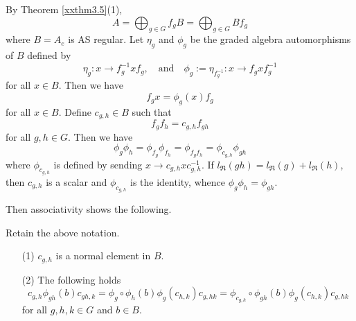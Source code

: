 By Theorem \ref{xxthm3.5}(1),
$$A=\bigoplus_{g\in G} f_g B=\bigoplus_{g\in G} B f_g$$
where $B=A_e$ is AS regular. Let $\eta_g$ and $\phi_g$ be the
graded algebra automorphisms of $B$ defined by
\begin{equation}
\label{E3.5.1}\tag{E3.5.1}
\eta_g: x\to f_{g}^{-1} x f_g, \quad {\text{and}} \quad 
\phi_{g}:=\eta_{f_g^{-1}}: x\to f_g x f_g^{-1}
\end{equation}
for all $x\in B$. Then we have 
$$f_g x= \phi_g(x) f_g$$ 
for all $x\in B$. Define $c_{g,h}\in B$ such that
\begin{equation}
\label{E3.5.2}\tag{E3.5.2}
 f_g f_h=c_{g,h} f_{gh}
\end{equation}
for all $g,h\in G$. Then we have
$$\phi_{g}\phi_{h}=
\phi_{f_g}\phi_{f_h}=\phi_{f_g f_h}=\phi_{c_{g,h}}\phi_{gh}$$
where $\phi_{c_{g,h}}$ is defined by sending 
$x\to c_{g,h} x c_{g,h}^{-1}$. If ${l_{\Re}}(gh)={l_{\Re}}(g)+{l_{\Re}}(h)$,
then $c_{g,h}$ is a scalar and $\phi_{c_{g,h}}$ is 
the identity, whence $\phi_{g}\phi_{h}=\phi_{gh}$.

Then associativity shows the following.

\begin{lemma}
\label{xxlem3.6}
Retain the above notation. 
\begin{enumerate}
\item[(1)]
$c_{g,h}$ is a normal element in $B$.
\item[(2)]
The following holds
$$c_{g,h}\phi_{gh}(b) c_{gh,k}=\phi_{g}\circ \phi_{h}(b) \phi_{g}(c_{h,k})
c_{g,hk}=\phi_{c_{g,h}}\circ \phi_{gh}(b) \phi_{g}(c_{h,k})
c_{g,hk}$$
for all $g,h,k\in G$ and $b\in B$.
\end{enumerate}
\end{lemma}

